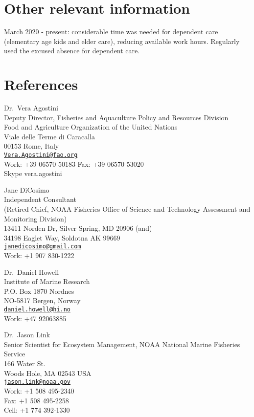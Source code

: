 \documentclass[11pt, a4paper]{awesome-cv}
\begin{document}
\hypertarget{other-relevant-information}{%
\section{Other relevant information}\label{other-relevant-information}}

March 2020 - present: considerable time was needed for dependent care
(elementary age kids and elder care), reducing available work hours.
Regularly used the excused absence for dependent care.

\hypertarget{references}{%
\section{References}\label{references}}

Dr.~Vera Agostini\\
Deputy Director, Fisheries and Aquaculture Policy and Resources
Division\\
Food and Agriculture Organization of the United Nations\\
Viale delle Terme di Caracalla\\
00153 Rome, Italy\\
\href{mailto:Vera.Agostini@fao.org}{\nolinkurl{Vera.Agostini@fao.org}}\\
Work: +39 06570 50183 Fax: +39 06570 53020\\
Skype vera.agostini

Jane DiCosimo\\
Independent Consultant\\
(Retired Chief, NOAA Fisheries Office of Science and Technology
Assessment and Monitoring Division)\\
13411 Norden Dr, Silver Spring, MD 20906 (and)\\
34198 Eaglet Way, Soldotna AK 99669\\
\href{mailto:janedicosimo@gmail.com}{\nolinkurl{janedicosimo@gmail.com}}\\
Work: +1 907 830-1222

Dr.~Daniel Howell\\
Institute of Marine Research\\
P.O. Box 1870 Nordnes\\
NO-5817 Bergen, Norway\\
\href{mailto:daniel.howell@hi.no}{\nolinkurl{daniel.howell@hi.no}}\\
Work: +47 92063885

Dr.~Jason Link\\
Senior Scientist for Ecosystem Management, NOAA National Marine
Fisheries Service\\
166 Water St.\\
Woods Hole, MA 02543 USA\\
\href{mailto:jason.link@noaa.gov}{\nolinkurl{jason.link@noaa.gov}}\\
Work: +1 508 495-2340\\
Fax: +1 508 495-2258\\
Cell: +1 774 392-1330
\end{document}

